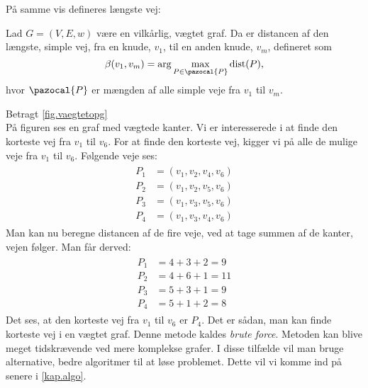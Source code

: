 På samme vis defineres længste vej:

\begin{defn} 
	Lad $G=(V,E,w)$ være en vilkårlig, vægtet graf. Da er distancen af den længste, simple vej, fra en knude, $v_1$, til en anden knude, $v_m$, defineret som
	\begin{equation}
		\beta(v_1,v_m)=\arg \max_{P \in \pazocal{P}}
		\textrm{dist}(P),
	\end{equation}
	hvor $\pazocal{P}$ er mængden af alle simple veje fra $v_1$ til $v_m$.
\end{defn}

\begin{exmp}
Betragt \autoref{fig.vaegtetopg} \\

På figuren ses en graf med vægtede kanter. Vi er interesserede i at finde den korteste vej fra $v_1$ til $v_6$. For at finde den korteste vej, kigger vi på alle de mulige veje fra $v_1$ til $v_6$.
Følgende veje ses:
\begin{align}
\begin{split}
	P_1&=(v_1,v_2,v_4,v_6)\\
	P_2&=(v_1,v_2,v_5,v_6)\\
	P_3&=(v_1,v_3,v_5,v_6)\\
	P_4&=(v_1,v_3,v_4,v_6)
\end{split}
\end{align}
Man kan nu beregne distancen af de fire veje, ved at tage summen af de kanter, vejen følger. Man får derved:
\begin{align}
\begin{split}
	P_1&= 4+3+2=9\\
	P_2&= 4+6+1=11\\
	P_3&= 5+3+1=9\\
	P_4&= 5+1+2=8
\end{split}
\end{align}
Det ses, at den korteste vej fra $v_1$ til $v_6$ er $P_4$. 
Det er sådan, man kan finde korteste vej i en vægtet graf. Denne metode kaldes \emph{brute force}. Metoden kan blive meget tidskrævende ved mere komplekse grafer. I disse tilfælde vil man bruge alternative, bedre algoritmer til at løse problemet. Dette vil vi komme ind på senere i \autoref{kap.algo}.
\end{exmp}


